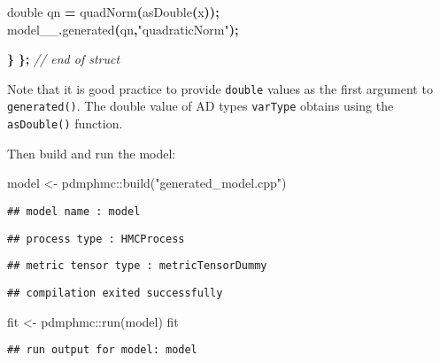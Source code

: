 \documentclass[
]{book}
\newenvironment{Shaded}{\begin{snugshade}}{\end{snugshade}}
\newcommand{\CommentTok}[1]{\textcolor[rgb]{0.56,0.35,0.01}{\textit{#1}}}
\newcommand{\DataTypeTok}[1]{\textcolor[rgb]{0.13,0.29,0.53}{#1}}
\newcommand{\FunctionTok}[1]{\textcolor[rgb]{0.00,0.00,0.00}{#1}}
\newcommand{\NormalTok}[1]{#1}
\newcommand{\OperatorTok}[1]{\textcolor[rgb]{0.81,0.36,0.00}{\textbf{#1}}}
\newcommand{\OtherTok}[1]{\textcolor[rgb]{0.56,0.35,0.01}{#1}}
\newcommand{\SpecialCharTok}[1]{\textcolor[rgb]{0.00,0.00,0.00}{#1}}
\newcommand{\StringTok}[1]{\textcolor[rgb]{0.31,0.60,0.02}{#1}}
\begin{document}
\begin{Shaded}
\begin{Highlighting}[]
    \DataTypeTok{double}\NormalTok{ qn }\OperatorTok{=}\NormalTok{ quadNorm}\OperatorTok{(}\NormalTok{asDouble}\OperatorTok{(}\NormalTok{x}\OperatorTok{));}
\NormalTok{    model\_\_}\OperatorTok{.}\NormalTok{generated}\OperatorTok{(}\NormalTok{qn}\OperatorTok{,}\StringTok{"quadraticNorm"}\OperatorTok{);}
    
  \OperatorTok{\}} 
\OperatorTok{\};} \CommentTok{// end of struct}
\end{Highlighting}
\end{Shaded}

Note that it is good practice to provide \texttt{double} values as the first argument to \texttt{generated()}. The double value of AD types \texttt{varType} obtains using the \texttt{asDouble()} function.

Then build and run the model:

\begin{Shaded}
\begin{Highlighting}[]
\NormalTok{model }\OtherTok{\textless{}{-}}\NormalTok{ pdmphmc}\SpecialCharTok{::}\FunctionTok{build}\NormalTok{(}\StringTok{"generated\_model.cpp"}\NormalTok{)}
\end{Highlighting}
\end{Shaded}

\begin{verbatim}
## model name : model
\end{verbatim}

\begin{verbatim}
## process type : HMCProcess
\end{verbatim}

\begin{verbatim}
## metric tensor type : metricTensorDummy
\end{verbatim}

\begin{verbatim}
## compilation exited successfully
\end{verbatim}

\begin{Shaded}
\begin{Highlighting}[]
\NormalTok{fit }\OtherTok{\textless{}{-}}\NormalTok{ pdmphmc}\SpecialCharTok{::}\FunctionTok{run}\NormalTok{(model)}
\NormalTok{fit}
\end{Highlighting}
\end{Shaded}

\begin{verbatim}
## run output for model: model
\end{verbatim}
\end{document}
